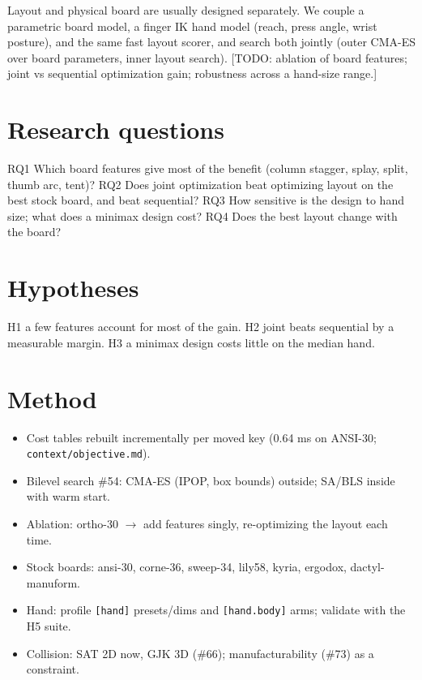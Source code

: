 \documentclass{gecko-paper}
\begin{document}
\makepapertitle
\begin{paperabstract}
Layout and physical board are usually designed separately. We couple a
parametric board model, a finger IK hand model (reach, press angle,
wrist posture), and the same fast layout scorer, and search both jointly
(outer CMA-ES over board parameters, inner layout search). {[}TODO:
ablation of board features; joint vs sequential optimization gain;
robustness across a hand-size range.{]}

\end{paperabstract}
\begin{paperbody}
\section{Research questions}

RQ1 Which board features give most of the benefit (column stagger,
splay, split, thumb arc, tent)? RQ2 Does joint optimization beat
optimizing layout on the best stock board, and beat sequential? RQ3 How
sensitive is the design to hand size; what does a minimax design cost?
RQ4 Does the best layout change with the board?

\section{Hypotheses}

H1 a few features account for most of the gain. H2 joint beats
sequential by a measurable margin. H3 a minimax design costs little on
the median hand.

\section{Method}

\begin{itemize}
\setlength{\itemsep}{1pt}\setlength{\parskip}{0pt}
\item
  Cost tables rebuilt incrementally per moved key (0.64 ms on ANSI-30;
  \texttt{context/objective.md}).
\item
  Bilevel search \#54: CMA-ES (IPOP, box bounds) outside; SA/BLS inside
  with warm start.
\item
  Ablation: ortho-30 $\to$ add features singly, re-optimizing the layout
  each time.
\item
  Stock boards: ansi-30, corne-36, sweep-34, lily58, kyria, ergodox,
  dactyl-manuform.
\item
  Hand: profile \texttt{{[}hand{]}} presets/dims and
  \texttt{{[}hand.body{]}} arms; validate with the H5 suite.
\item
  Collision: SAT 2D now, GJK 3D (\#66); manufacturability (\#73) as a
  constraint.
\end{itemize}


\end{paperbody}
\end{document}
